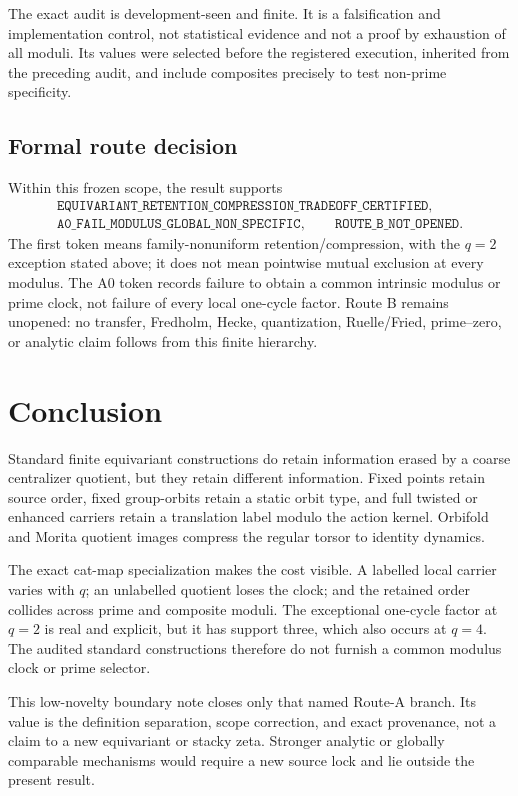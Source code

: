 \documentclass[11pt]{article}
\theoremstyle{definition}
\theoremstyle{remark}
\newcommand{\classification}{\texttt{EQUIVARIANT\_RETENTION\_COMPRESSION\_TRADEOFF\_CERTIFIED}}
\newcommand{\routea}{\texttt{A0\_FAIL\_MODULUS\_GLOBAL\_NON\_SPECIFIC}}
\newcommand{\routeb}{\texttt{ROUTE\_B\_NOT\_OPENED}}
\begin{document}
The exact audit is development-seen and finite.  It is a falsification and
implementation control, not statistical evidence and not a proof by
exhaustion of all moduli.  Its values were selected before the registered
execution, inherited from the preceding audit, and include composites
precisely to test non-prime specificity.

\subsection{Formal route decision}

Within this frozen scope, the result supports
\[
\begin{gathered}
  \classification,\\
  \routea,\qquad \routeb.
\end{gathered}
\]
The first token means family-nonuniform retention/compression, with the
\(q=2\) exception stated above; it does not mean pointwise mutual exclusion
at every modulus.  The A0 token records failure to obtain a common intrinsic
modulus or prime clock, not failure of every local one-cycle factor.  Route B
remains unopened: no transfer, Fredholm, Hecke, quantization, Ruelle/Fried,
prime--zero, or analytic claim follows from this finite hierarchy.

\section{Conclusion}
\label{sec:conclusion}

Standard finite equivariant constructions do retain information erased by a
coarse centralizer quotient, but they retain different information.  Fixed
points retain source order, fixed group-orbits retain a static orbit type,
and full twisted or enhanced carriers retain a translation label modulo the
action kernel.  Orbifold and Morita quotient images compress the regular
torsor to identity dynamics.

The exact cat-map specialization makes the cost visible.  A labelled local
carrier varies with \(q\); an unlabelled quotient loses the clock; and the
retained order collides across prime and composite moduli.  The exceptional
one-cycle factor at \(q=2\) is real and explicit, but it has support three,
which also occurs at \(q=4\).  The audited standard constructions therefore
do not furnish a common modulus clock or prime selector.

This low-novelty boundary note closes only that named Route-A branch.  Its
value is the definition separation, scope correction, and exact provenance,
not a claim to a new equivariant or stacky zeta.  Stronger analytic or
globally comparable mechanisms would require a new source lock and lie
outside the present result.
\end{document}
